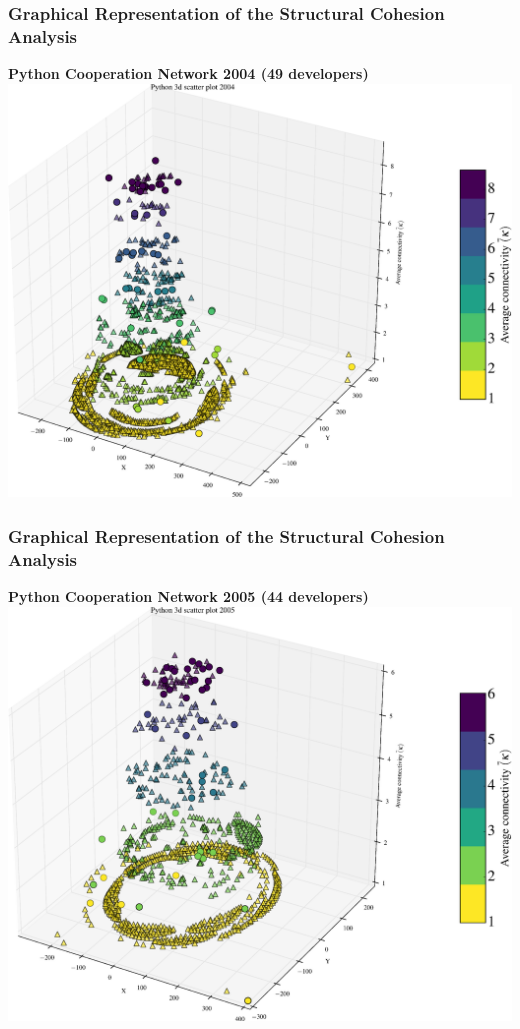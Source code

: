\documentclass[ignorenonframetext,red,8pt,notes=hide]{beamer}
\begin{document}
\begin{frame}
\frametitle{Graphical Representation of the Structural Cohesion Analysis}

\begin{center}
\textbf{Python Cooperation Network 2004 (49 developers)}
\includegraphics[scale=0.25]{img/3d_scatter_python_2004}
\end{center}

\end{frame}

\begin{frame}
\frametitle{Graphical Representation of the Structural Cohesion Analysis}

\begin{center}
\textbf{Python Cooperation Network 2005 (44 developers)}
\includegraphics[scale=0.25]{img/3d_scatter_python_2005}
\end{center}

\end{frame}
\end{document}
